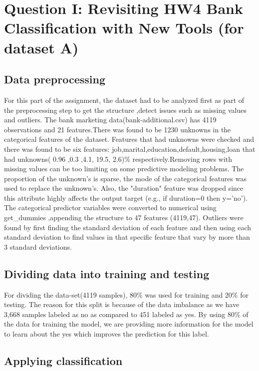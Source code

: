 \section{Question I: Revisiting HW4 Bank Classification with New Tools (for dataset A)}
\subsection{Data preprocessing}
For this part of the assignment, the dataset had to be analyzed first as part of the preprocessing step to get the structure ,detect issues such as missing values and outliers. The bank marketing data(bank-additional.csv) has 4119 observations and 21 features.There was found to be 1230 unknowns in the categorical features of the dataset. Features that had unknowns were checked and there was found to be six features: job,marital,education,default,housing,loan that had unknowns( 0.96 ,0.3 ,4.1,  19.5, 2.6)\% respectively.Removing rows with missing values can be too limiting on some predictive modeling problems. The proportion of the unknown's is sparse, the mode of the categorical features was used to replace the unknown's. Also, the "duration" feature was dropped since this attribute highly affects the output target (e.g., if duration=0 then y='no').
The categorical predictor variables  were converted  to numerical using get\_dummies ,appending the structure to 47 features (4119,47).
Outliers were found by first finding the standard deviation of each feature and then using each standard deviation to find values in that specific feature that vary by more than 3 standard deviations. 

\subsection{Dividing data into training and testing}
For dividing the data-set(4119 samples), 80\% was used for training and 20\% for testing. The reason for this split is because of the data imbalance as we have  3,668 samples labeled as no as compared to 451 labeled as yes. By using 80\% of the data for training the model, we are providing more information for the model to learn about the yes which improves the prediction for this label. %


\subsection{Applying classification}

